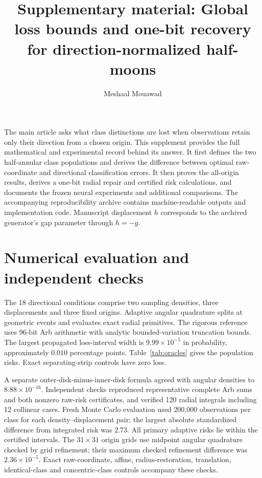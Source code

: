 \documentclass[10 pt,a 4 paper]{article}
\title{Supplementary material: Global loss bounds and one-bit recovery for direction-normalized half-moons}
\author{Meshaal Mouawad}
\date{}
\begin{document}
\maketitle
\noindent The main article asks what class distinctions are lost when observations retain only their direction from a chosen origin. This supplement provides the full mathematical and experimental record behind its answer. It first defines the two half-annular class populations and derives the difference between optimal raw-coordinate and directional classification errors. It then proves the all-origin results, derives a one-bit radial repair and certified risk calculations, and documents the frozen neural experiments and additional comparisons. The accompanying reproducibility archive contains machine-readable outputs and implementation code. Manuscript displacement $h$ corresponds to the archived generator's gap parameter through $h=-g$.




\section{Numerical evaluation and independent checks}
The 18 directional conditions comprise two sampling densities, three displacements and three fixed origins. Adaptive angular quadrature splits at geometric events and evaluates exact radial primitives. The rigorous reference uses 96-bit Arb arithmetic with analytic bounded-variation truncation bounds. The largest propagated loss-interval width is $9.99\times 10^{-5}$ in probability, approximately $0.010$ percentage points. Table~\ref{tab:oracles} gives the population risks. Exact separating-strip controls have zero loss.

A separate outer-disk-minus-inner-disk formula agreed with angular densities to $8.88\times 10^{-16}$. Independent checks reproduced representative complete Arb sums and both nonzero raw-risk certificates, and verified 120 radial integrals including 12 collinear cases. Fresh Monte Carlo evaluation used 200,000 observations per class for each density--displacement pair; the largest absolute standardized difference from integrated risk was $2.73$. All primary adaptive risks lie within the certified intervals. The $31\times 31$ origin grids use midpoint angular quadrature checked by grid refinement; their maximum checked refinement difference was $2.36\times 10^{-5}$. Exact raw-coordinate, affine, radius-restoration, translation, identical-class and concentric-class controls accompany these checks.

\end{document}
